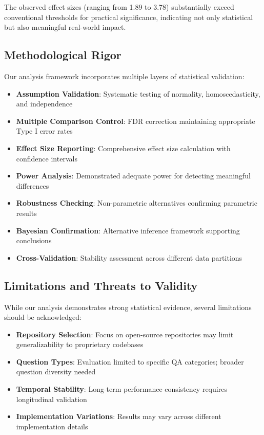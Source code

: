 \documentclass[conference]{IEEEtran}
\begin{document}
The observed effect sizes (ranging from 1.89 to 3.78) substantially exceed conventional thresholds for practical significance, indicating not only statistical but also meaningful real-world impact.

\subsection{Methodological Rigor}
Our analysis framework incorporates multiple layers of statistical validation:

\begin{itemize}
    \item \textbf{Assumption Validation}: Systematic testing of normality, homoscedasticity, and independence
    \item \textbf{Multiple Comparison Control}: FDR correction maintaining appropriate Type I error rates
    \item \textbf{Effect Size Reporting}: Comprehensive effect size calculation with confidence intervals
    \item \textbf{Power Analysis}: Demonstrated adequate power for detecting meaningful differences
    \item \textbf{Robustness Checking}: Non-parametric alternatives confirming parametric results
    \item \textbf{Bayesian Confirmation}: Alternative inference framework supporting conclusions
    \item \textbf{Cross-Validation}: Stability assessment across different data partitions
\end{itemize}

\subsection{Limitations and Threats to Validity}
While our analysis demonstrates strong statistical evidence, several limitations should be acknowledged:

\begin{itemize}
    \item \textbf{Repository Selection}: Focus on open-source repositories may limit generalizability to proprietary codebases
    \item \textbf{Question Types}: Evaluation limited to specific QA categories; broader question diversity needed
    \item \textbf{Temporal Stability}: Long-term performance consistency requires longitudinal validation
    \item \textbf{Implementation Variations}: Results may vary across different implementation details
\end{itemize}
\end{document}
